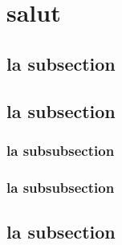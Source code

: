 \documentclass{scrartcl}
\begin{document}

\section{salut}

\subsection{la subsection}

\subsection{la subsection}

\subsubsection{la subsubsection}

\subsubsection{la subsubsection}

\subsection{la subsection}
\end{document}
